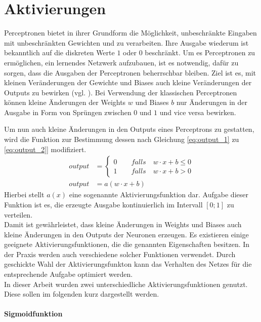 \documentclass[../main.tex]{subfiles}
\begin{document}
\section{Aktivierungen}
Perceptronen bietet in ihrer Grundform die Möglichkeit, unbeschränkte Eingaben mit unbeschränkten Gewichten und zu verarbeiten. Ihre Ausgabe wiederum ist bekanntlich auf die diskreten Werte $1$ oder $0$ beschränkt. Um es Perceptronen zu ermöglichen, ein lernendes Netzwerk aufzubauen, ist es notwendig, dafür zu sorgen, dass die Ausgaben der Perceptronen beherrschbar bleiben. Ziel ist es, mit kleinen Veränderungen der Gewichte und Biases auch kleine Veränderungen der Outputs zu bewirken (vgl. \cite{NNADL_sigmoid_1}). Bei Verwendung der klassischen Perceptronen können kleine Änderungen der Weights $w$ und Biases $b$ nur Änderungen in der Ausgabe in Form von Sprüngen zwischen $0$ und $1$ und vice versa bewirken. \par
Um nun auch kleine Änderungen in den Outputs eines Perceptrons zu gestatten, wird die Funktion zur Bestimmung dessen nach Gleichung \ref{eq:output_1} zu \ref{eq:output_2}] modifiziert. 
\begin{align}\label{eq:output_1}
	output &= \left \{ \begin{matrix}
	0 \qquad falls \quad w \cdot x + b \leq 0 \\ 1 \qquad falls \quad w\cdot x + b > 0
	\end{matrix} \right . \\\label{eq:output_2}
	output &= a(w\cdot x + b) 
\end{align}
Hierbei stellt $a(x)$ eine sogenannte Aktivierungsfunktion dar. Aufgabe dieser Funktion ist es, die erzeugte Ausgabe kontinuierlich im Intervall $[0;1]$ zu verteilen. \\ Damit ist gewährleistet, dass kleine Änderungen in Weights und Biases auch kleine Änderungen in den Outputs der Neuronen erzeugen. Es existieren einige geeignete Aktivierungsfunktionen, die die genannten Eigenschaften besitzen. In der Praxis werden auch verschiedene solcher Funktionen verwendet. Durch geschickte Wahl der Aktivierungsfunkton kann das Verhalten des Netzes für die entsprechende Aufgabe optimiert werden.\\ In dieser Arbeit wurden zwei unterschiedliche Aktivierungsfunktionen genutzt. Diese sollen im folgenden kurz dargestellt werden. \paragraph{Sigmoidfunktion} 
\end{document}

